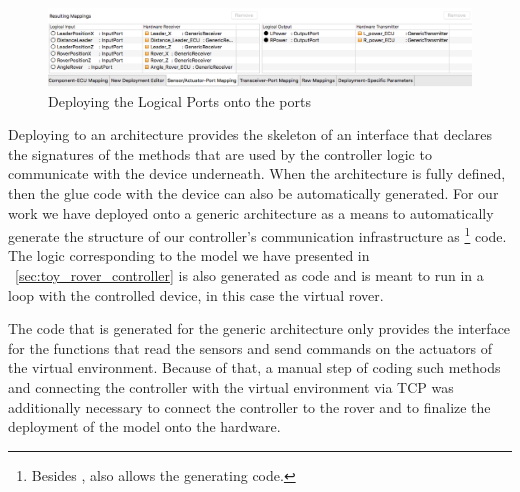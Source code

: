 \begin{figure}[!h]
\centering
\includegraphics[width=1\textwidth]{images/newMapping.png}
\caption{Deploying the Logical Ports onto the \ecu ports}
\label{fig:deployment_ports}
\end{figure}
 
Deploying to an architecture provides the skeleton of an interface that declares
the signatures of the methods that are used by the controller logic to
communicate with the device underneath. When the architecture is fully defined,
then the glue code with the device can also be automatically generated. For our
work we have deployed onto a generic architecture as a means to automatically
generate the structure of our controller's communication infrastructure as \clang\footnote{Besides \clang, \af also allows the generating \java code.} code. The logic corresponding to the model we have presented in
\sect~\ref{sec:toy_rover_controller} is also generated as \clang code and is
meant to run in a loop with the controlled device, in this case the virtual
rover.

The \clang code that is generated for the generic architecture only provides the
interface for the functions that read the sensors and send commands on the
actuators of the virtual environment. Because of that, a manual step of
coding such methods and connecting the controller with the virtual environment
via TCP was additionally necessary to connect the controller to the rover and to
finalize the deployment of the model onto the hardware.


